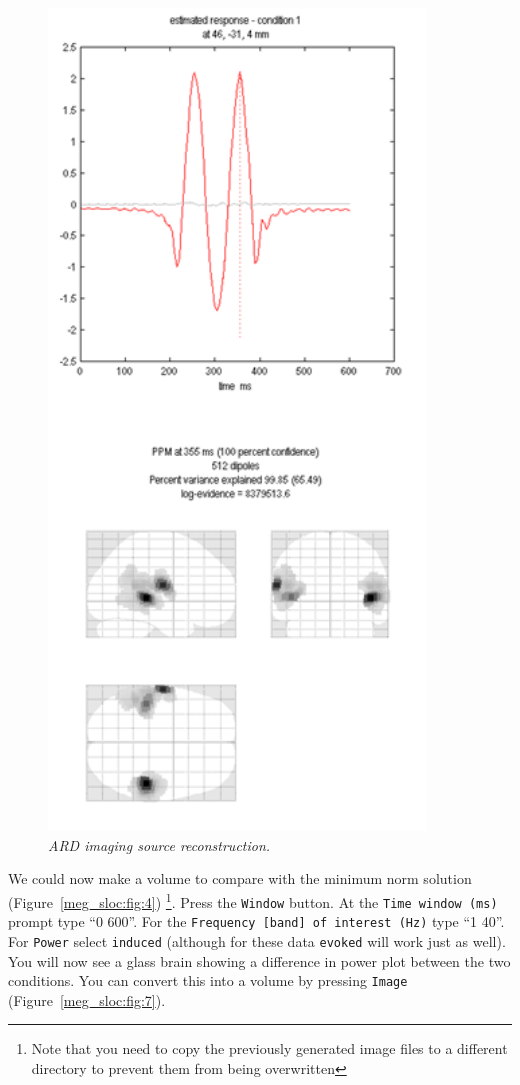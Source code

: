 \begin{figure}
\begin{center}
\includegraphics[width=100mm]{meg_sloc/slide6}
\caption{\em ARD imaging source reconstruction.\label{meg_sloc:fig:6}}
\end{center}
\end{figure}


We could now make a volume to compare with the minimum norm solution (Figure~\ref{meg_sloc:fig:4}) \footnote{Note that you need to copy the previously generated image files to a different directory to prevent them from being overwritten}. Press the \texttt{Window} button. At the \texttt{Time window (ms)} prompt type ``0 600''. For the \texttt{Frequency [band] of interest (Hz)} type ``1 40''. For \texttt{Power} select \texttt{induced} (although for these data \texttt{evoked} will work just as well). You will now see a glass brain showing a difference in power plot between the two conditions. You can convert this into a volume by pressing \texttt{Image} (Figure~\ref{meg_sloc:fig:7}).

